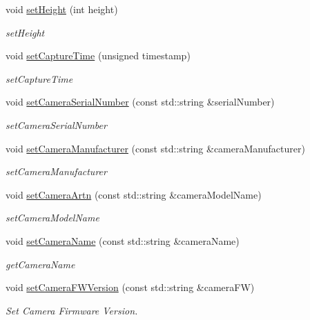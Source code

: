 \begin{DoxyCompactItemize}
void \hyperlink{classwtl_1_1_source_meta_data_af2b87e293f1a6ce5a5920752abef850f}{set\+Height} (int height)
\begin{DoxyCompactList}\small\item\em set\+Height \end{DoxyCompactList}\item 
void \hyperlink{classwtl_1_1_source_meta_data_af8903a429b9f6187c3843d4f32e18dce}{set\+Capture\+Time} (unsigned timestamp)
\begin{DoxyCompactList}\small\item\em set\+Capture\+Time \end{DoxyCompactList}\item 
void \hyperlink{classwtl_1_1_source_meta_data_a53490561664545c7d1b7223a2c6fc9c1}{set\+Camera\+Serial\+Number} (const std\+::string \&serial\+Number)
\begin{DoxyCompactList}\small\item\em set\+Camera\+Serial\+Number \end{DoxyCompactList}\item 
void \hyperlink{classwtl_1_1_source_meta_data_a9d14f13a2af810a1b055da76ad0abf3e}{set\+Camera\+Manufacturer} (const std\+::string \&camera\+Manufacturer)
\begin{DoxyCompactList}\small\item\em set\+Camera\+Manufacturer \end{DoxyCompactList}\item 
void \hyperlink{classwtl_1_1_source_meta_data_a86eb2818b26e117721323890aaf1a800}{set\+Camera\+Artn} (const std\+::string \&camera\+Model\+Name)
\begin{DoxyCompactList}\small\item\em set\+Camera\+Model\+Name \end{DoxyCompactList}\item 
void \hyperlink{classwtl_1_1_source_meta_data_a065ad8b3e7cd473f95d7891d28afcb62}{set\+Camera\+Name} (const std\+::string \&camera\+Name)
\begin{DoxyCompactList}\small\item\em get\+Camera\+Name \end{DoxyCompactList}\item 
void \hyperlink{classwtl_1_1_source_meta_data_aeb8f04e1d221954919f36178da738862}{set\+Camera\+F\+W\+Version} (const std\+::string \&camera\+FW)
\begin{DoxyCompactList}\small\item\em Set Camera Firmware Version. \end{DoxyCompactList}\item 

\end{DoxyCompactItemize}
